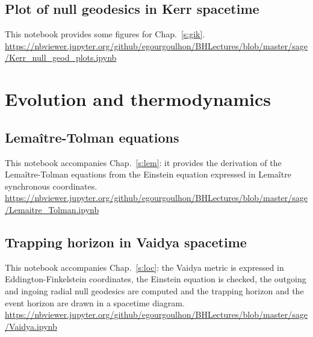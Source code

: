 \subsection{Plot of null geodesics in Kerr spacetime} \label{s:sam:Kerr_null_geod_plots}

This notebook provides some figures for Chap.~\ref{s:gik}.\\[1ex]
{\footnotesize
\url{https://nbviewer.jupyter.org/github/egourgoulhon/BHLectures/blob/master/sage/Kerr_null_geod_plots.ipynb}
}



\section{Evolution and thermodynamics}

\subsection{Lemaître-Tolman equations} \label{s:sam:Lemaitre-Tolman}

This notebook accompanies Chap.~\ref{s:lem}: it provides the derivation
of the Lemaître-Tolman equations from the Einstein equation expressed in
Lemaître synchronous coordinates.\\[1ex]
{\footnotesize
\url{https://nbviewer.jupyter.org/github/egourgoulhon/BHLectures/blob/master/sage/Lemaitre_Tolman.ipynb}
}

\subsection{Trapping horizon in Vaidya spacetime} \label{s:sam:Vaidya_trapping}

This notebook accompanies Chap.~\ref{s:loc}: the Vaidya metric is expressed in  Eddington-Finkelstein coordinates, the Einstein equation is checked, the outgoing and ingoing radial null geodesics are computed and the trapping horizon and the event
horizon are drawn in a spacetime diagram. \\[1ex]
{\footnotesize
\url{https://nbviewer.jupyter.org/github/egourgoulhon/BHLectures/blob/master/sage/Vaidya.ipynb}
}
